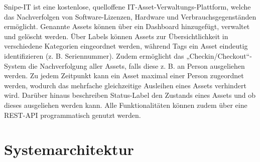 Snipe-IT ist eine kostenlose, quelloffene IT-Asset-Verwaltungs-Plattform,
welche das Nachverfolgen von Software-Lizenzen, Hardware und
Verbrauchsgegenständen ermöglicht. Genannte Assets können über ein Dashboard
hinzugefügt, verwaltet und gelöscht werden. Über Labels können Assets zur
Übersichtlichkeit in verschiedene Kategorien eingeordnet werden, während
Tags ein Asset eindeutig identifizieren (z. B. Seriennummer). Zudem ermöglicht
das „Checkin/Checkout“-System die Nachverfolgung aller Assets, falls diese
z. B.  an Person ausgeliehen werden. Zu jedem Zeitpunkt kann ein Asset
maximal einer Person zugeordnet werden, wodurch das mehrfache gleichzeitige
Ausleihen eines Assets verhindert wird. Darüber hinaus beschreiben Status-Label
den Zustands eines Assets und ob dieses ausgeliehen werden kann. Alle
Funktionalitäten können zudem über eine REST-API programmatisch genutzt werden.


\section{Systemarchitektur}
